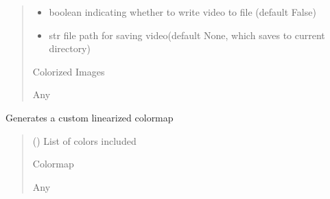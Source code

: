 \documentclass[letterpaper,10pt,english]{sphinxmanual}
\begin{document}
\begin{fulllineitems}
\begin{quote}
\begin{description}
\begin{itemize}
\item {} 
\sphinxAtStartPar
{} \textendash{} boolean indicating whether to write video to file (default False)

\item {} 
\sphinxAtStartPar
{} \textendash{} str file path for saving video(default None, which saves to current directory)

\end{itemize}

\sphinxAtStartPar
Colorized Images

\sphinxAtStartPar
Any

\end{description}\end{quote}

\end{fulllineitems}


\begin{fulllineitems}
\label{\detokenize{Colorizer:Colorizer.generate_custom_map}}
\pysigstartsignatures
{}
\pysigstopsignatures
\sphinxAtStartPar
Generates a custom linearized colormap
\begin{quote}\begin{description}
\sphinxAtStartPar
{} (\sphinxstyleliteralemphasis{\sphinxupquote{{[}}}\sphinxstyleliteralemphasis{\sphinxupquote{{]}}}) \textendash{} List of colors included

\sphinxAtStartPar
Colormap

\sphinxAtStartPar
Any

\end{description}\end{quote}

\end{fulllineitems}

\end{document}

